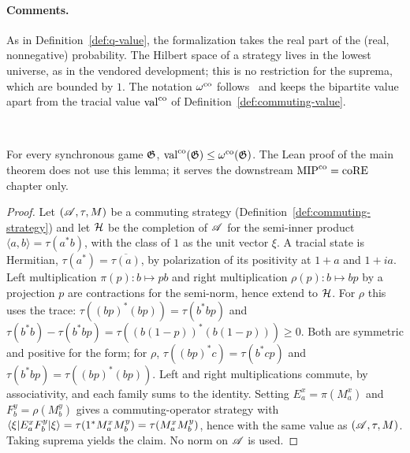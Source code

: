 \paragraph{Comments.} As in Definition~\ref{def:q-value}, the formalization takes the
real part of the (real, nonnegative) probability. The Hilbert space of a strategy lives
in the lowest universe, as in the vendored development; this is no restriction for the
suprema, which are bounded by $1$. The notation $\omega^{\mathrm{co}}$ follows~\cite{Vid26} and
keeps the bipartite value apart from the tracial value $\mathrm{val}^{\mathrm{co}}$ of
Definition~\ref{def:commuting-value}.

\effortMedium\ \qlib

\begin{lemma}
\label{lem:tracial-le-co}
\leanok
\qlib{}
For every synchronous game $\mathfrak{G}$, $\mathrm{val}^{\mathrm{co}}(\mathfrak{G}) \leq \omega^{\mathrm{co}}(\mathfrak{G})$.
The Lean proof of the main theorem does not use this lemma; it serves the downstream
$\mathrm{MIP}^{\mathrm{co}} = \mathrm{coRE}$ chapter only.
\end{lemma}
\begin{proof}
\leanok
Let $(\mathscr{A}, \tau, M)$ be a commuting strategy (Definition~\ref{def:commuting-strategy})
and let $\mathcal{H}$ be the completion of $\mathscr{A}$ for the semi-inner product
$\langle a, b \rangle = \tau(a^* b)$, with the class of $1$ as the unit vector $\xi$.
A tracial state is Hermitian, $\tau(a^*) = \overline{\tau(a)}$, by polarization of its
positivity at $1 + a$ and $1 + ia$. Left multiplication $\pi(p) : b \mapsto pb$ and right
multiplication $\rho(p) : b \mapsto bp$ by a projection $p$ are contractions for the
semi-norm, hence extend to $\mathcal{H}$. For $\rho$ this uses the trace:
$\tau((bp)^*(bp)) = \tau(b^* b p)$ and $\tau(b^* b) - \tau(b^* b p) = \tau((b(1-p))^*(b(1-p)))
\geq 0$. Both are symmetric and positive for the form; for $\rho$,
$\tau((bp)^* c) = \tau(b^* c p)$ and $\tau(b^* b p) = \tau((bp)^*(bp))$. Left and right
multiplications commute, by associativity, and each family sums to the identity. Setting
$E^x_a = \pi(M^x_a)$ and $F^y_b = \rho(M^y_b)$ gives a commuting-operator strategy with
$\langle\xi| E^x_a F^y_b |\xi\rangle = \tau(1^* M^x_a M^y_b) = \tau(M^x_a M^y_b)$, hence with the
same value as $(\mathscr{A}, \tau, M)$. Taking suprema yields the claim. No norm on $\mathscr{A}$ is used.
\end{proof}

